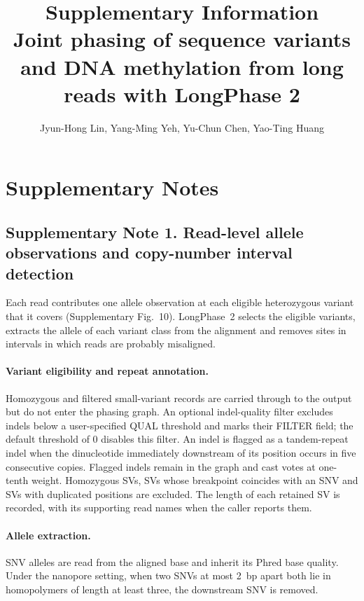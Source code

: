 \documentclass[11pt,a4paper]{article}
\title{Supplementary Information\\[6pt]
\large Joint phasing of sequence variants and DNA methylation from long reads with LongPhase 2}
\author{Jyun-Hong Lin, Yang-Ming Yeh, Yu-Chun Chen, Yao-Ting Huang}
\date{}
\newcommand{\toolname}{LongPhase~2\xspace}
\begin{document}
\sloppy
\maketitle

\tableofcontents
\clearpage

\section*{Supplementary Notes}

\subsection*{Supplementary Note 1. Read-level allele observations and copy-number interval detection}

Each read contributes one allele observation at each eligible heterozygous variant that it covers (Supplementary Fig.~10). \toolname selects the eligible variants, extracts the allele of each variant class from the alignment and removes sites in intervals in which reads are probably misaligned.

\paragraph{Variant eligibility and repeat annotation.} Homozygous and filtered small-variant records are carried through to the output but do not enter the phasing graph. An optional indel-quality filter excludes indels below a user-specified QUAL threshold and marks their FILTER field; the default threshold of 0 disables this filter. An indel is flagged as a tandem-repeat indel when the dinucleotide immediately downstream of its position occurs in five consecutive copies. Flagged indels remain in the graph and cast votes at one-tenth weight. Homozygous SVs, SVs whose breakpoint coincides with an SNV and SVs with duplicated positions are excluded. The length of each retained SV is recorded, with its supporting read names when the caller reports them.

\paragraph{Allele extraction.} SNV alleles are read from the aligned base and inherit its Phred base quality. Under the nanopore setting, when two SNVs at most 2~bp apart both lie in homopolymers of length at least three, the downstream SNV is removed.
\end{document}
